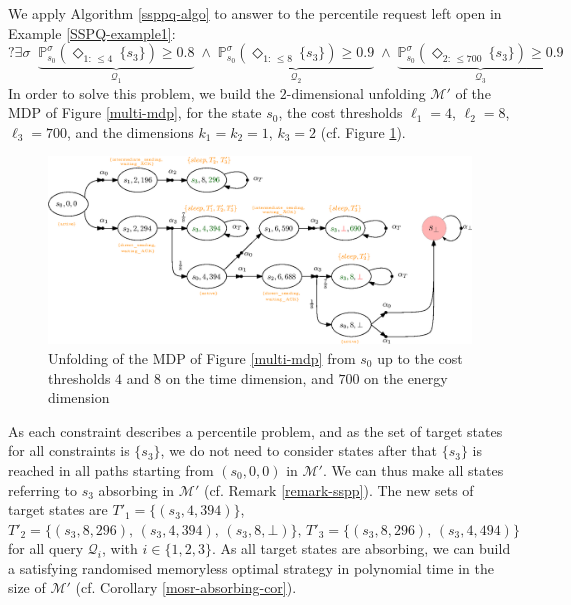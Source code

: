 \begin{example}\label{final-example}
  We apply Algorithm \ref{ssppq-algo} to answer to the percentile request left open in Example \ref{SSPQ-example1}:
  \[
  ?\exists \sigma \;\; \underbrace{\mathbb{P}^{\sigma}_{s_0}(\Diamond_{1: \, \leq 4} \, \{s_3\}) \geq 0.8}_{\mathcal{Q}_1} \; \wedge \;
   \underbrace{\mathbb{P}^{\sigma}_{s_0}(\Diamond_{1: \, \leq 8} \, \{s_3\}) \geq 0.9}_{\mathcal{Q}_2} \; \wedge \;
  \underbrace{\mathbb{P}_{s_0}^{\sigma}(\Diamond_{2: \, \leq 700} \, \{s_3\}) \geq 0.9}_{\mathcal{Q}_3}
  \]
  In order to solve this \SSPPQ{} problem, we build the $2$-dimensional unfolding $\mathcal{M'}$ of the MDP of Figure \ref{multi-mdp}, for the state $s_0$, the cost thresholds $\ell_1 = 4$, $\ell_2 = 8$, $\ell_3 = 700$, and the dimensions $k_1 = k_2 = 1$, $k_3 = 2$ (cf. Figure \ref{multi-unfolding}).
  \begin{figure}[h]
    \centering
    \includegraphics[width=\linewidth]{resources/SSP-PQ-unfolding}
    \captionsetup{justification=centering}
    \caption{Unfolding of the MDP of Figure \ref{multi-mdp} from $s_0$ up to the cost thresholds $4$ and $8$ on the time dimension, and $700$ on the energy dimension}
    \label{multi-unfolding}
  \end{figure}
  As each constraint describes a percentile problem,
  and as the set of target states for all constraints is $\{s_3\}$, we do not need to consider states after that $\{s_3\}$ is reached in all paths starting from $(s_0, 0, 0)$ in $\mathcal{M}'$.
  We can thus make all states referring to $s_3$  absorbing in $\mathcal{M}'$ (cf. Remark \ref{remark-sspp}).
  The new sets of target states are $T'_1 = \{(s_3, 4, 394)\}$, $T'_2 = \{(s_3, 8, 296), \, (s_3, 4, 394), \, (s_3, 8, \bot)\}, \, T'_3 = \{ (s_3, 8, 296), \, (s_3, 4, 494) \}$
  for all query $\mathcal{Q}_i$, with $i \in \{1, 2, 3\}$. As all target states are absorbing, we can build a satisfying randomised memoryless optimal strategy in polynomial time in the size of $\mathcal{M}'$ (cf. Corollary \ref{mosr-absorbing-cor}).

\end{example}
